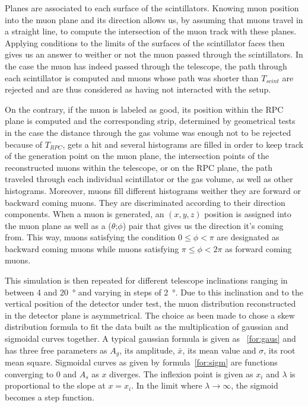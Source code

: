 			Planes are associated to each surface of the scintillators. Knowing muon position into the muon plane and its direction allows us, by assuming that muons travel in a straight line, to compute the intersection of the muon track with these planes. Applying conditions to the limits of the surfaces of the scintillator faces then gives us an answer to weither or not the muon passed through the scintillators. In the case the muon has indeed passed through the telescope, the path through each scintillator is computed and muons whose path was shorter than $T_{scint}$ are rejected and are thus considered as having not interacted with the setup.
			
			On the contrary, if the muon is labeled as good, its position within the RPC plane is computed and the corresponding strip, determined by geometrical tests in the case the distance through the gas volume was enough not to be rejected because of $T_{RPC}$, gets a hit and several histograms are filled in order to keep track of the generation point on the muon plane, the intersection points of the reconstructed muons within the telescope, or on the RPC plane, the path traveled through each individual scintillator or the gas volume, as well as other histograms. Moreover, muons fill different histograms weither they are forward or backward coming muons. They are discriminated according to their direction components. When a muon is generated, an $(x,y,z)$ position is assigned into the muon plane as well as a ($\theta$;$\phi$) pair that gives us the direction it's coming from. This way, muons satisfying the condition $0\leq\phi<\pi$ are designated as backward coming muons while muons satisfying $\pi\leq\phi<2\pi$ as forward coming muons.
			
			This simulation is then repeated for different telescope inclinations ranging in between 4 and \SI{20}{\degree} and varying in steps of \SI{2}{\degree}. Due to this inclination and to the vertical position of the detector under test, the muon distribution reconstructed in the detector plane is asymmetrical. The choice as been made to chose a skew distribution formula to fit the data built as the multiplication of gaussian and sigmoidal curves together. A typical gaussian formula is given as ~\ref{for:gaus} and has three free parameters as $A_g$, its amplitude, $\bar{x}$, its mean value and $\sigma$, its root mean square. Sigmoidal curves as given by formula~\ref{for:sigm} are functions converging to $0$ and $A_s$ as $x$ diverges. The inflexion point is given as $x_i$ and $\lambda$ is proportional to the slope at $x = x_i$. In the limit where $\lambda\longrightarrow\infty$, the sigmoid becomes a step function.
			
